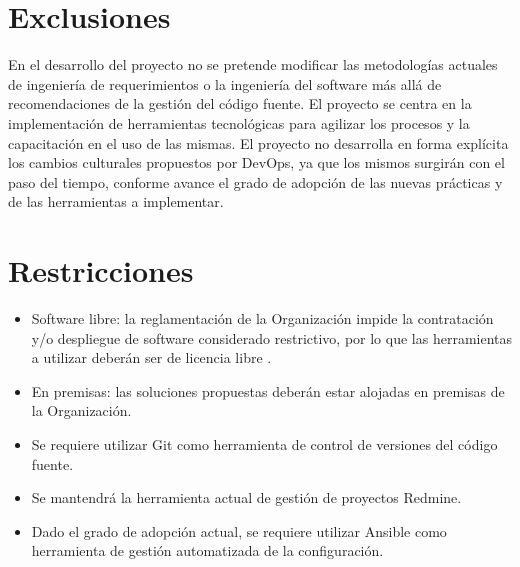 \section{Exclusiones}
%
En el desarrollo del proyecto no se pretende modificar las
metodologías actuales de ingeniería de requerimientos o la ingeniería
del software más allá de recomendaciones de la gestión del código
fuente. El proyecto se centra en la implementación de herramientas
tecnológicas para agilizar los procesos y la capacitación en el uso de
las mismas. El proyecto no desarrolla en forma explícita los cambios
culturales propuestos por DevOps, ya que los mismos surgirán con el
paso del tiempo, conforme avance el grado de adopción de las nuevas
prácticas y de las herramientas a implementar.
%
%
\section{Restricciones}
%
\begin{itemize}
\item Software libre: la reglamentación de la Organización impide la
  contratación y/o despliegue de software considerado restrictivo, por
  lo que las herramientas a utilizar deberán ser de licencia libre
  \cite{unllibre}.
\item En premisas: las soluciones propuestas deberán estar alojadas en
  premisas de la Organización.
\item Se requiere utilizar Git como herramienta de control de
  versiones del código fuente.
\item Se mantendrá la herramienta actual de gestión de proyectos
  Redmine.
\item Dado el grado de adopción actual, se requiere utilizar Ansible
  como herramienta de gestión automatizada de la configuración.
\end{itemize}
%
